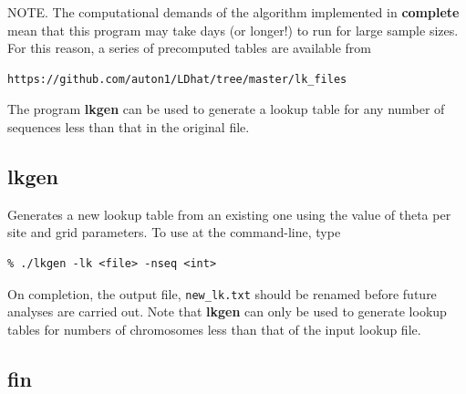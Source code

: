 \documentclass[a4paper,10pt,fullpage]{article}
\begin{document}
\noindent NOTE.  The computational demands of the algorithm
implemented in {\bf complete} mean that this program may take days
(or longer!) to run for large sample sizes.  For this reason, a
series of precomputed tables are available from
\begin{verbatim}
https://github.com/auton1/LDhat/tree/master/lk_files
\end{verbatim}

\noindent The
program {\bf lkgen} can be used to generate a lookup table for any
number of sequences less than that in the original file.

\subsection{lkgen}

Generates a new lookup table from an existing one using the value
of theta per site and grid parameters.  To use at the
command-line, type\\
\begin{verbatim}
% ./lkgen -lk <file> -nseq <int>
\end{verbatim}

\noindent On completion, the output file, {\verb+new_lk.txt+} should be
renamed before future analyses are carried out.  Note that {\bf lkgen} can only be used to generate lookup tables for numbers of chromosomes less than that of the input lookup file.


\subsection{fin}
\end{document}
